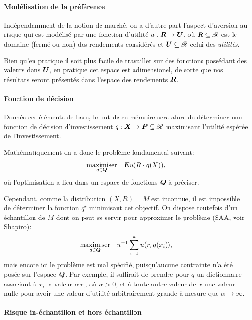 \paragraph{Modélisation de la préférence}

Indépendamment de la notion de marché, on a d'autre part l'aspect d'aversion au risque qui
est modélisé par une fonction d'utilité $u:\R\to\U$, où $\R \subseteq \Re$ est le domaine (fermé ou
non) des rendements considérés et $\U \subseteq \Re$ celui des \textit{utilités}.

Bien qu'en pratique il soit plus facile de travailler sur des fonctions possédant des
valeurs dans $\U$, en pratique cet espace est adimensionel\cit, de sorte que nos résultats
seront présentés dans l'espace des rendements $\R$.


\paragraph{Fonction de décision}

Donnés ces éléments de base, le but de ce mémoire sera alors de déterminer une fonction de
décision d'investissement $q: \X \to \P \subseteq \Re$ maximisant l'utilité espérée de l'investissement.

Mathématiquement on a donc le problème fondamental suivant:
\begin{equation}
  \maximizeEquation[q \in \Q]{\E u(R \cdot q(X)),}
\end{equation}
où l'optimisation a lieu dans un espace de fonctions $\Q$ à préciser.

Cependant, comme la distribution $(X,R) = M$ est inconnue, il est impossible de déterminer
la fonction $q^\star$ minimisant cet objectif. On dispose toutefois d'un échantillon de
$M$ dont on peut se servir pour approximer le problème (SAA, voir Shapiro\cit):
\begin{equation}
  \maximizeEquation[q \in \Q]{n^{-1} \sumi u(r_i\, q(x_i)),}
\end{equation}
mais encore ici le problème est mal spécifié, puisqu'aucune contrainte n'a été posée sur
l'espace $\Q$. Par exemple, il suffirait de prendre pour $q$ un dictionnaire associant à
$x_i$ la valeur $\alpha\,r_i$, où $\alpha > 0$, et à toute autre valeur de $x$ une valeur nulle pour
avoir une valeur d'utilité arbitrairement grande à mesure que $\alpha \to \infty$.


\paragraph{Risque in-échantillon et hors échantillon}

